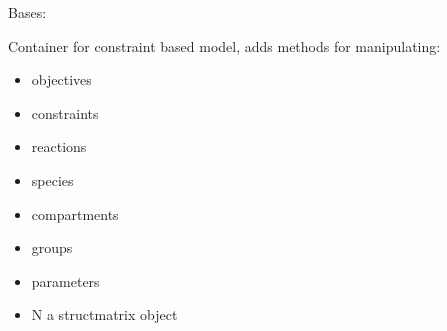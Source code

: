 \documentclass[letterpaper,12pt,english]{sphinxmanual}
\begin{document}
\begin{fulllineitems}
\label{\detokenize{api/core:cbmpy.CBModel.Model}}
\pysigstartsignatures
\pysiglinewithargsret
{}
{}
{}
\pysigstopsignatures
\sphinxAtStartPar
Bases: {\hyperref[\detokenize{api/core:cbmpy.CBModel.Fbase}]{}}

\sphinxAtStartPar
Container for constraint based model, adds methods for manipulating:
\begin{itemize}
\item {} 
\sphinxAtStartPar
objectives

\item {} 
\sphinxAtStartPar
constraints

\item {} 
\sphinxAtStartPar
reactions

\item {} 
\sphinxAtStartPar
species

\item {} 
\sphinxAtStartPar
compartments

\item {} 
\sphinxAtStartPar
groups

\item {} 
\sphinxAtStartPar
parameters

\item {} 
\sphinxAtStartPar
N a structmatrix object

\end{itemize}

\begin{fulllineitems}
\label{\detokenize{api/core:cbmpy.CBModel.Model.prefix}}
\pysigstartsignatures
\pysigline
{}
\pysigstopsignatures
\end{fulllineitems}


\begin{fulllineitems}
\label{\detokenize{api/core:cbmpy.CBModel.Model.suffix}}
\pysigstartsignatures
\pysigline
{}
\pysigstopsignatures
\end{fulllineitems}


\end{fulllineitems}
\end{document}
